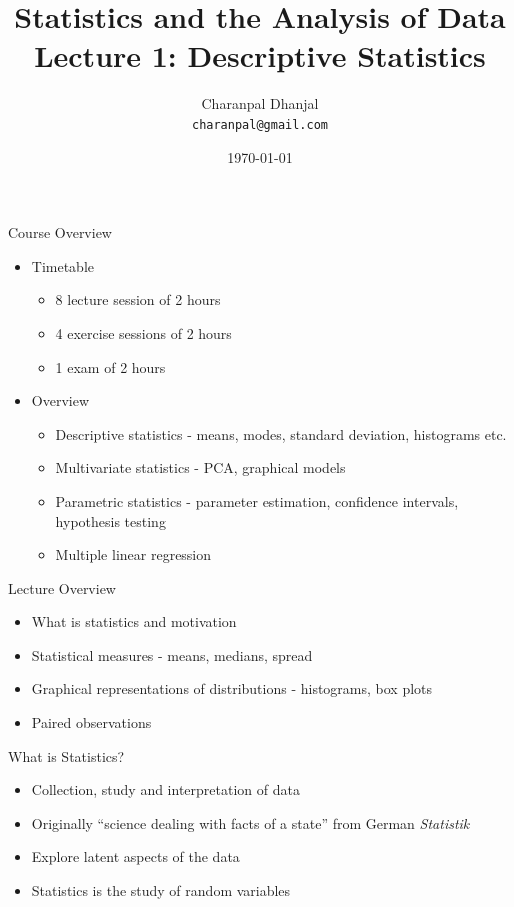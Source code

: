 \documentclass{beamer}
\title{Statistics and the Analysis of Data\\ Lecture 1: Descriptive Statistics}
\author{Charanpal Dhanjal \\ \texttt{charanpal@gmail.com}}
\institute{\'{E}cole des Ponts}
\date{\today}
\begin{document}
\frame{\titlepage}

\begin{frame}{Course Overview}
\begin{itemize}
\item Timetable 
\begin{itemize}
\item 8 lecture session of 2 hours
\item 4 exercise sessions of 2 hours
\item 1 exam of 2 hours 
\end{itemize}
\item Overview
\begin{itemize} 
\item Descriptive statistics - means, modes, standard deviation, histograms etc. 
\item Multivariate statistics - PCA, graphical models
\item Parametric statistics - parameter estimation, confidence intervals, hypothesis testing    
\item Multiple linear regression 
\end{itemize}
\end{itemize}
\end{frame}

\begin{frame}{Lecture Overview}
\begin{itemize} 
 \item What is statistics and motivation
\item Statistical measures - means, medians, spread 
\item Graphical representations of distributions - histograms, box plots 
\item Paired observations  
\end{itemize}
\end{frame}

\begin{frame}{What is Statistics?}  
 \begin{itemize} 
\item Collection, study and interpretation of data 
\item Originally ``science dealing with facts of a state'' from German \emph{Statistik}
\item Explore latent aspects of the data 
\item Statistics is the study of random variables  
 \end{itemize}
\end{frame}
\end{document}
